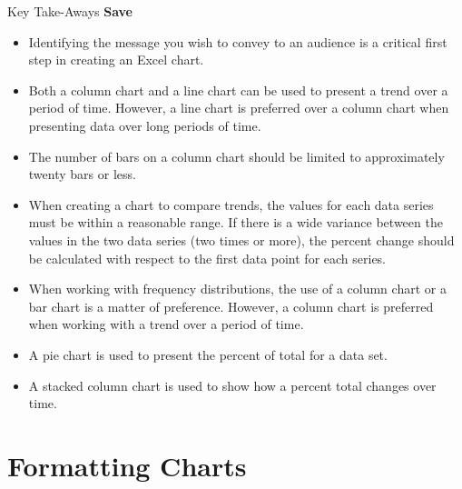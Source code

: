 \begin{center}
	\begin{tkwbox}{Key Take-Aways}
		\textbf{Save}
		\\
		\begin{itemize}
			\setlength{\itemsep}{0pt}
			\setlength{\parskip}{0pt}
			\setlength{\parsep}{0pt}
			
			\item Identifying the message you wish to convey to an audience is a critical first step in creating an Excel chart.
			\item Both a column chart and a line chart can be used to present a trend over a period of time. However, a line chart is preferred over a column chart when presenting data over long periods of time.
			\item The number of bars on a column chart should be limited to approximately twenty bars or less.
			\item When creating a chart to compare trends, the values for each data series must be within a reasonable range. If there is a wide variance between the values in the two data series (two times or more), the percent change should be calculated with respect to the first data point for each series.
			\item When working with frequency distributions, the use of a column chart or a bar chart is a matter of preference. However, a column chart is preferred when working with a trend over a period of time.
			\item A pie chart is used to present the percent of total for a data set.
			\item A stacked column chart is used to show how a percent total changes over time.

		\end{itemize}
	\end{tkwbox}
\end{center}

\section{Formatting Charts}

